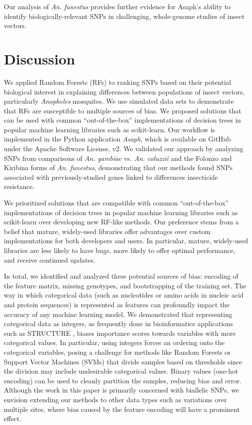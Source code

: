 Our analysis of \emph{An. funestus} provides further evidence for Asaph's ability to identify biologically-relevant SNPs in challenging, whole-genome studies of insect vectors.

\section{Discussion}
We applied Random Forests (RFs) to ranking SNPs based on their potential biological interest in explaining differences between populations of insect vectors, particularly \emph{Anopheles} mosquites.  We use simulated data sets to demonstrate that RFs are susceptible to multiple sources of bias. We proposed solutions that can be used with common ``out-of-the-box'' implementations of decision trees in popular machine learning libraries such as scikit-learn.  Our workflow is implemented in the Python application \emph{Asaph}, which is available on GitHub under the Apache Software License, v2.  We validated our approach by analyzing SNPs from comparisons of \emph{An. gambiae} vs. \emph{An. coluzzii} and the Folonzo and Kiribina forms of \emph{An. funestus}, demonstrating that our methods found SNPs associated with previously-studied genes linked to differences insecticide resistance.

We prioritized solutions that are compatible with common ``out-of-the-box'' implementations of decision trees in popular machine learning libraries such as scikit-learn over developing new RF-like methods.  Our preference stems from a belief that mature, widely-used libraries offer advantages over custom implementations for both developers and users.  In particular, mature, widely-used libraries are less likely to have bugs, more likely to offer optimal performance, and receive continued updates.

In total, we identified and analyzed three potential sources of bias: encoding of the feature matrix, missing genotypes, and bootstrapping of the training set. The way in which categorical data (such as nucleotides or amino acids in nucleic acid and protein sequences) is represented as features can profoundly impact the accuracy of any machine learning model.  We demonstrated that representing categorical data as integers, as frequently done in bioinformatics applications such as STRUCTURE \cite{Pritchard2000}, biases importance scores towards variables with more categorical values.  In particular, using integers forces an ordering onto the categorical variables, posing a challenge for methods like Random Forests or Support Vector Machines (SVMs) that divide samples based on thresholds since the division may include undesirable categorical values.  Binary values (one-hot encoding) can be used to cleanly partition the samples, reducing bias and error.  Although the work in this paper is primarily concerned with biallelic SNPs, we envision extending our methods to other data types such as variations over multiple sites, where bias caused by the feature encoding will have a prominent effect.

